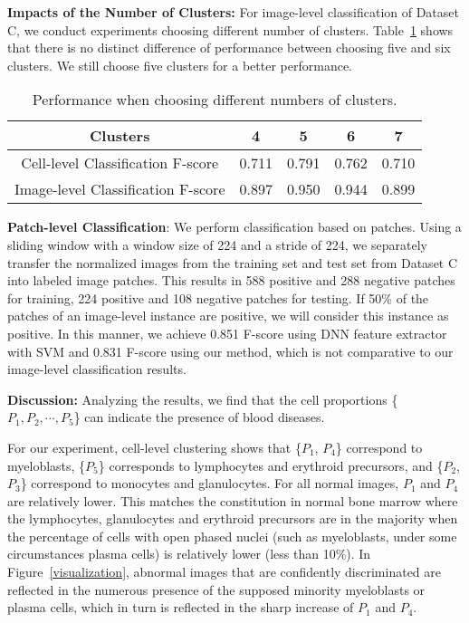 \documentclass[journal]{IEEEtran}
\begin{document}
{{\textbf{Impacts of the Number of Clusters:} For image-level classification of Dataset C, we conduct experiments choosing different number of clusters. Table~\ref{image-level-cluster} shows that there is no distinct difference of performance between choosing five and six clusters. We still choose five clusters for a better performance.}}

\begin{table}[H]
\centering
\caption{\textnormal{{Performance when choosing different numbers of clusters.}} }
\label{image-level-cluster}
\begin{tabular}{|c|c|c|c|c|}
\hline{\tiny{Clusters}}& {4}     & {5}     & {6}     & {7}     \\ \hline{\tiny{Cell-level Classification F-score}}  & {0.711} & {0.791} & {0.762} & {0.710} \\ \hline{\tiny{Image-level Classification F-score}} & {0.897} & {0.950} & {0.944} & {0.899} \\ \hline

\end{tabular}
\end{table}

{\textbf{Patch-level Classification}: We perform classification based on patches. Using a sliding window with a window size of 224 and a stride of 224, we separately transfer the normalized images from the training set and test set from Dataset C into labeled image patches. This results in 588 positive and 288 negative patches for training, 224 positive and 108 negative patches for testing. If 50\% of the patches of an image-level instance are positive, we will consider this instance as positive. In this manner, we achieve 0.851 F-score using DNN feature extractor with SVM and 0.831 F-score using our method, which is not comparative to our image-level classification results.}

\textbf{Discussion:}
Analyzing the results, we find that the cell proportions \{$P_1, P_2, \cdots, P_5$\} can indicate the presence of blood diseases.

For our experiment, cell-level clustering shows that \{$P_1$, $P_4$\} correspond to myeloblasts, \{$P_5$\} corresponds to lymphocytes and erythroid precursors, and \{$P_2$, $P_3$\} correspond to monocytes and glanulocytes. For all normal images, $P_1$ and $P_4$ are relatively lower. This matches the constitution in normal bone marrow where the lymphocytes, glanulocytes and erythroid precursors are in the majority when the percentage of cells with open phased nuclei (such as myeloblasts, under some circumstances plasma cells) is relatively lower (less than 10\%). In Figure~\ref{visualization}, abnormal images that are confidently discriminated are reflected in the numerous presence of the supposed minority myeloblasts or plasma cells, which in turn is reflected in the sharp increase of $P_1$ and $P_4$.
\end{document}
